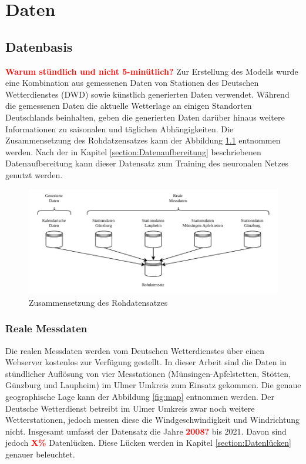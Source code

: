 \documentclass[
12pt, %
toc=listofnumbered, %
toc=chapterentrydotfill, %
numbers=noenddot, %
captions=tableheading, %
bibliography=numbered
]{scrreprt}
\let\Oldsection\section
\renewcommand{\section}{\FloatBarrier\Oldsection}
\let\Oldsubsection\subsection
\renewcommand{\subsection}{\FloatBarrier\Oldsubsection}
\newcommand{\highlight}[1]{\textbf{\textcolor{red}{#1}}}
\begin{document}
\chapter{Daten}

\section{Datenbasis}\label{section:datenbasis}
\highlight{Warum stündlich und nicht 5-minütlich?}
Zur Erstellung des Modells wurde eine Kombination aus gemessenen Daten von Stationen des Deutschen Wetterdienstes (DWD) sowie künstlich generierten Daten verwendet.
Während die gemessenen Daten die aktuelle Wetterlage an einigen Standorten Deutschlands beinhalten, geben die generierten Daten darüber hinaus weitere Informationen zu saisonalen und täglichen Abhängigkeiten. Die Zusammensetzung des Rohdatzensatzes kann der Abbildung \ref{fig:rohdatensatz} entnommen werden. Nach der in Kapitel \ref{section:Datenaufbereitung} beschriebenen Datenaufbereitung kann dieser Datensatz zum Training des neuronalen Netzes genutzt werden.

\begin{figure}[tph]
	\begin{center}
		\includegraphics[]{./images/rohdatensatz.pdf}
		\caption{Zusammensetzung des Rohdatensatzes}
		\label{fig:rohdatensatz}
	\end{center}
\end{figure}

\subsection{Reale Messdaten}
Die realen Messdaten werden vom Deutschen Wetterdienstes über einen Webserver kostenlos zur Verfügung gestellt. In dieser Arbeit sind die Daten in stündlicher Auflösung von vier Messtationen (Münsingen-Apfelstetten, Stötten, Günzburg und Laupheim) im Ulmer Umkreis zum Einsatz gekommen. Die genaue geographische Lage kann der Abbildung \ref{fig:map} entnommen werden. Der Deutsche Wetterdienst betreibt im Ulmer Umkreis zwar noch weitere Wetterstationen, jedoch messen diese die Windgeschwindigkeit und Windrichtung nicht. Insgesamt umfasst der Datensatz die Jahre \highlight{2008?} bis 2021. Davon sind jedoch \highlight{X\%} Datenlücken. Diese Lücken werden in Kapitel \ref{section:Datenlücken} genauer beleuchtet. 
\end{document}
